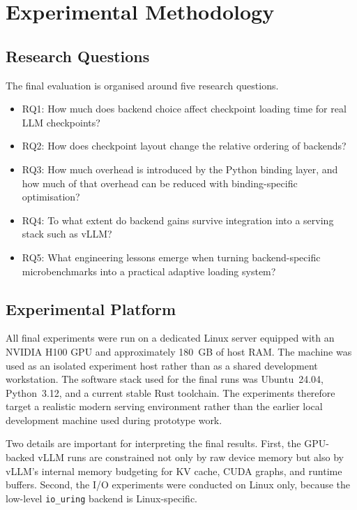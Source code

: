 \chapter{Experimental Methodology}
\label{chap:methodology}

\section{Research Questions}

The final evaluation is organised around five research questions.

\begin{itemize}
\item RQ1: How much does backend choice affect checkpoint loading time for real LLM checkpoints?
\item RQ2: How does checkpoint layout change the relative ordering of backends?
\item RQ3: How much overhead is introduced by the Python binding layer, and how much of that overhead can be reduced with binding-specific optimisation?
\item RQ4: To what extent do backend gains survive integration into a serving stack such as vLLM?
\item RQ5: What engineering lessons emerge when turning backend-specific microbenchmarks into a practical adaptive loading system?
\end{itemize}

\section{Experimental Platform}

All final experiments were run on a dedicated Linux server equipped with an NVIDIA H100 GPU and approximately 180~GB of host RAM. The machine was used as an isolated experiment host rather than as a shared development workstation. The software stack used for the final runs was Ubuntu~24.04, Python~3.12, and a current stable Rust toolchain. The experiments therefore target a realistic modern serving environment rather than the earlier local development machine used during prototype work.

Two details are important for interpreting the final results. First, the GPU-backed vLLM runs are constrained not only by raw device memory but also by vLLM's internal memory budgeting for KV cache, CUDA graphs, and runtime buffers. Second, the I/O experiments were conducted on Linux only, because the low-level \texttt{io\_uring} backend is Linux-specific.


